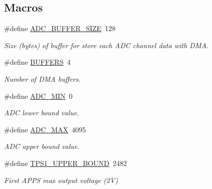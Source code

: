 \subsection*{Macros}
\begin{DoxyCompactItemize}
\item 
\mbox{\label{group___board__model__group_ga602abb8ec84dcb3b6f854a738310ea46}} 
\#define \mbox{\hyperlink{group___board__model__group_ga602abb8ec84dcb3b6f854a738310ea46}{A\+D\+C\+\_\+\+B\+U\+F\+F\+E\+R\+\_\+\+S\+I\+ZE}}~128
\begin{DoxyCompactList}\small\item\em Size (bytes) of buffer for store each A\+DC channel data with D\+MA. \end{DoxyCompactList}\item 
\#define \mbox{\hyperlink{group___board__model__group_gaabe0f927d44a09f458bd5fe5ab4e2f7f}{B\+U\+F\+F\+E\+RS}}~4
\begin{DoxyCompactList}\small\item\em Number of D\+MA buffers. \end{DoxyCompactList}\item 
\mbox{\label{group___board__model__group_gaf0098a1eafb8a60a1c65773e1064d595}} 
\#define \mbox{\hyperlink{group___board__model__group_gaf0098a1eafb8a60a1c65773e1064d595}{A\+D\+C\+\_\+\+M\+IN}}~0
\begin{DoxyCompactList}\small\item\em A\+DC lower bound value. \end{DoxyCompactList}\item 
\mbox{\label{group___board__model__group_ga555a695bf58df062dc03f0e892d95cd7}} 
\#define \mbox{\hyperlink{group___board__model__group_ga555a695bf58df062dc03f0e892d95cd7}{A\+D\+C\+\_\+\+M\+AX}}~4095
\begin{DoxyCompactList}\small\item\em A\+DC upper bound value. \end{DoxyCompactList}\item 
\mbox{\label{group___board__model__group_ga6741cba3daf129b6f73eed1b1db09519}} 
\#define \mbox{\hyperlink{group___board__model__group_ga6741cba3daf129b6f73eed1b1db09519}{T\+P\+S1\+\_\+\+U\+P\+P\+E\+R\+\_\+\+B\+O\+U\+ND}}~2482
\begin{DoxyCompactList}\small\item\em First A\+P\+PS max output voltage (2V) \end{DoxyCompactList}\item 

\end{DoxyCompactItemize}
